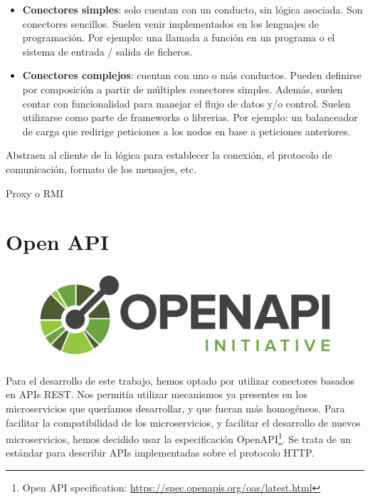 \begin{itemize}
    \item \textbf{Conectores simples}: solo cuentan con un conducto, sin lógica asociada. Son conectores sencillos. Suelen venir implementados en los lenguajes de programación. Por ejemplo: una llamada a función en un programa o el sistema de entrada / salida de ficheros.

    \item \textbf{Conectores complejos}: cuentan con uno o más conductos. Pueden definirse por composición a partir de múltiples conectores simples. Además, suelen contar con funcionalidad para manejar el flujo de datos y/o control. Suelen utilizarse como parte de frameworks o librerias. Por ejemplo: un balanceador de carga que redirige peticiones a los nodos en base a peticiones anteriores.
\end{itemize}

Abstraen al cliente de la lógica para establecer la conexión, el protocolo de comunicación, formato de los mensajes, etc.

Proxy o RMI

\section{Open API}

\begin{figure}
  \vspace{15pt}
  \includegraphics[scale=0.34]{service_connectors/images/openapi-logo}
  \centering
  \vspace{15pt}
\end{figure}

Para el desarrollo de este trabajo, hemos optado por utilizar conectores basados en APIs REST. Nos permitía utilizar mecanismos ya presentes en los microservicios que queríamos desarrollar, y que fueran más homogéneos.
Para facilitar la compatibilidad de los microservicios, y facilitar el desarrollo de nuevos microservicios, hemos decidido usar la especificación OpenAPI\footnote{Open API specification: \url{https://spec.openapis.org/oas/latest.html}}. Se trata de un estándar para describir APIs implementadas sobre el protocolo HTTP.

